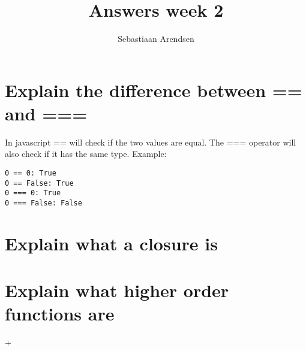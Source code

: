 \documentclass[a4paper]{scrartcl}
\title{Answers week 2}
\author{Sebastiaan Arendsen}
\begin{document}
\maketitle

\section{Explain the difference between == and ===}
In javascript == will check if the two values are equal. The === operator will also check if it has the same type. Example:

\begin{lstlisting}
0 == 0: True
0 == False: True
0 === 0: True
0 === False: False
\end{lstlisting}

\section{Explain what a closure is}


\section{Explain what higher order functions are}
+
\end{document}
